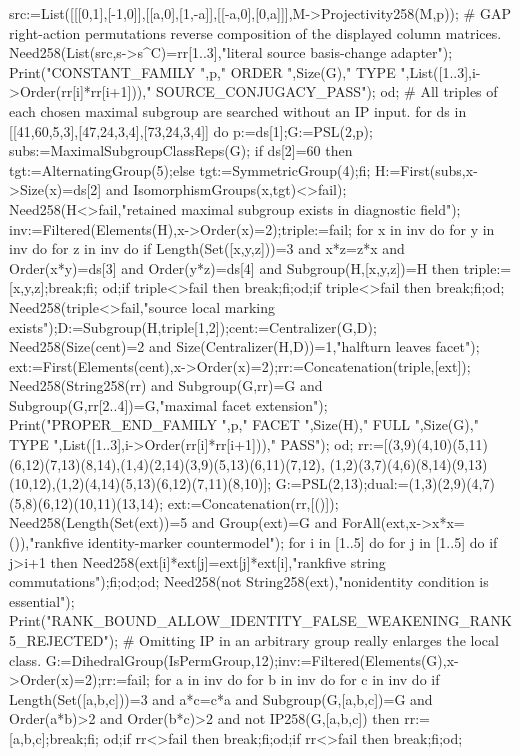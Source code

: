 \documentclass[11pt,a4paper]{article}
\begin{document}
\begin{CompleteProgram}
 src:=List([[[0,1],[-1,0]],[[a,0],[1,-a]],[[-a,0],[0,a]]],M->Projectivity258(M,p));
 # GAP right-action permutations reverse composition of the displayed column matrices.
 Need258(List(src,s->s^C)=rr{[1..3]},"literal source basis-change adapter");
 Print("CONSTANT_FAMILY ",p," ORDER ",Size(G)," TYPE ",List([1..3],i->Order(rr[i]*rr[i+1]))," SOURCE_CONJUGACY_PASS\n");
 od;
 # All triples of each chosen maximal subgroup are searched without an IP input.
 for ds in [[41,60,5,3],[47,24,3,4],[73,24,3,4]] do
 p:=ds[1];G:=PSL(2,p);
 subs:=MaximalSubgroupClassReps(G);
 if ds[2]=60 then tgt:=AlternatingGroup(5);else tgt:=SymmetricGroup(4);fi;
 H:=First(subs,x->Size(x)=ds[2] and IsomorphismGroups(x,tgt)<>fail);
 Need258(H<>fail,"retained maximal subgroup exists in diagnostic field");
 inv:=Filtered(Elements(H),x->Order(x)=2);triple:=fail;
 for x in inv do for y in inv do for z in inv do
 if Length(Set([x,y,z]))=3 and x*z=z*x and Order(x*y)=ds[3] and Order(y*z)=ds[4] and Subgroup(H,[x,y,z])=H then triple:=[x,y,z];break;fi;
 od;if triple<>fail then break;fi;od;if triple<>fail then break;fi;od;
 Need258(triple<>fail,"source local marking exists");D:=Subgroup(H,triple{[1,2]});cent:=Centralizer(G,D);
 Need258(Size(cent)=2 and Size(Centralizer(H,D))=1,"halfturn leaves facet");
 ext:=First(Elements(cent),x->Order(x)=2);rr:=Concatenation(triple,[ext]);
 Need258(String258(rr) and Subgroup(G,rr)=G and Subgroup(G,rr{[2..4]})=G,"maximal facet extension");
 Print("PROPER_END_FAMILY ",p," FACET ",Size(H)," FULL ",Size(G)," TYPE ",List([1..3],i->Order(rr[i]*rr[i+1]))," PASS\n");
 od;
 rr:=[(3,9)(4,10)(5,11)(6,12)(7,13)(8,14),(1,4)(2,14)(3,9)(5,13)(6,11)(7,12),
 (1,2)(3,7)(4,6)(8,14)(9,13)(10,12),(1,2)(4,14)(5,13)(6,12)(7,11)(8,10)];
 G:=PSL(2,13);dual:=(1,3)(2,9)(4,7)(5,8)(6,12)(10,11)(13,14);
 ext:=Concatenation(rr,[()]);
 Need258(Length(Set(ext))=5 and Group(ext)=G and ForAll(ext,x->x*x=()),"rankfive identity-marker countermodel");
 for i in [1..5] do for j in [1..5] do if j>i+1 then
 Need258(ext[i]*ext[j]=ext[j]*ext[i],"rankfive string commutations");fi;od;od;
 Need258(not String258(ext),"nonidentity condition is essential");
 Print("RANK_BOUND_ALLOW_IDENTITY_FALSE_WEAKENING_RANK5_REJECTED\n");
 # Omitting IP in an arbitrary group really enlarges the local class.
 G:=DihedralGroup(IsPermGroup,12);inv:=Filtered(Elements(G),x->Order(x)=2);rr:=fail;
 for a in inv do for b in inv do for c in inv do
 if Length(Set([a,b,c]))=3 and a*c=c*a and Subgroup(G,[a,b,c])=G
 and Order(a*b)>2 and Order(b*c)>2 and not IP258(G,[a,b,c]) then rr:=[a,b,c];break;fi;
 od;if rr<>fail then break;fi;od;if rr<>fail then break;fi;od;

\end{CompleteProgram}
\end{document}
